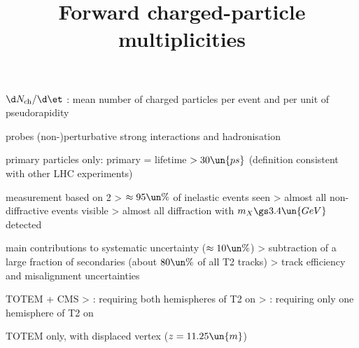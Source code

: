 \newpage %
\title{Forward charged-particle multiplicities}

\> $\d N_{\rm ch} / \d\et$ : mean number of charged particles per event and per unit of pseudorapidity

\> probes (non-)perturbative strong interactions and hadronisation 

\> primary particles only: primary = lifetime $> 30\un{ps}$ (definition consistent with other LHC experiments)

\> measurement based on 2
\>> $\approx 95\un{\%}$ of inelastic events seen
\>> almost all non-diffractive events visible
\>> almost all diffraction with $m_X \gs 3.4\un{GeV}$ detected

\centerline{}


\newpage %


\centerline{
	\hskip3mm
}

\> main contributions to systematic uncertainty ($\approx 10\un{\%}$)
\>> subtraction of a large fraction of secondaries (about $80\un{\%}$ of all T2 tracks)
\>> track efficiency and misalignment uncertainties




\newpage %

\> TOTEM + CMS
\>> : requiring both hemispheres of T2 on
\>> : requiring only one hemisphere of T2 on

\centerline{
	\hskip3mm
}

\> TOTEM only, with displaced vertex ($z = 11.25\un{m}$)

